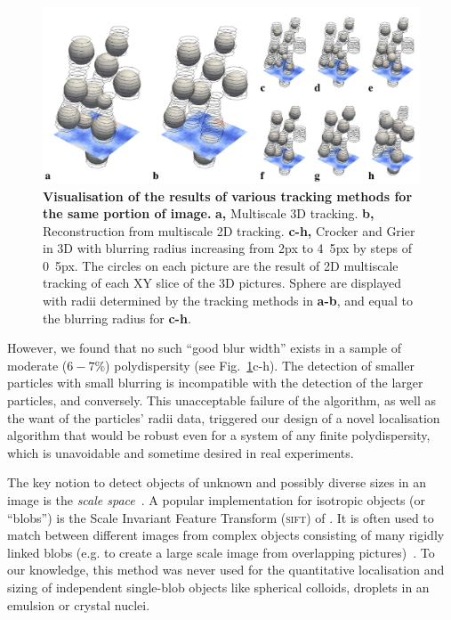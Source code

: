 \documentclass[8.5pt,twoside,twocolumn]{article}
\begin{document}
\begin{figure}
\centering
\includegraphics{fig_localise.pdf}
\caption{\textbf{Visualisation of the results of various tracking methods for the same portion of image.} \textbf{a,} Multiscale 3D tracking. \textbf{b,} Reconstruction from multiscale 2D tracking. \textbf{c-h,} Crocker and Grier in 3D with blurring radius increasing from \unit{2}{px} to \unit{4.5}{px} by steps of \unit{0.5}{px}. The circles on each picture are the result of 2D multiscale tracking of each XY slice of the 3D pictures. Sphere are displayed with radii determined by the tracking methods in \textbf{a-b}, and equal to the blurring radius for \textbf{c-h}.}
	\label{fig:localise}
\end{figure}

However, we found that no such ``good blur width'' exists in a sample of moderate ($6-7\%$) polydispersity (see Fig.~\ref{fig:localise}c-h). The detection of smaller particles with small blurring is incompatible with the detection of the larger particles, and conversely. This unacceptable failure of the \citet{Crocker1996} algorithm, as well as the want of the particles' radii data, triggered our design of a novel localisation algorithm that would be robust even for a system of any finite polydispersity, which is unavoidable and sometime desired in real experiments.

The key notion to detect objects of unknown and possibly diverse sizes in an image is the \emph{scale space}~\cite{Lindeberg1993}. A popular implementation for isotropic objects (or ``blobs'') is the Scale Invariant Feature Transform (\textsc{sift}) of \citet{Lowe2004}. It is often used to match between different images from complex objects consisting of many rigidly linked blobs (e.g. to create a large scale image from overlapping pictures)~\citep{Lowe2004, Urschler2006, Cheung2009}. To our knowledge, this method was never used for the quantitative localisation and sizing of independent single-blob objects like spherical colloids, droplets in an emulsion or crystal nuclei.
\end{document}

